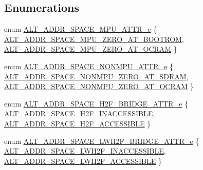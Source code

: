 \subsection*{Enumerations}
\begin{DoxyCompactItemize}
\item 
enum \mbox{\hyperlink{group__ADDR__SPACE__MGR__REMAP_gae16f0dfb718350b5140753a935059440}{A\+L\+T\+\_\+\+A\+D\+D\+R\+\_\+\+S\+P\+A\+C\+E\+\_\+\+M\+P\+U\+\_\+\+A\+T\+T\+R\+\_\+e}} \{ \mbox{\hyperlink{group__ADDR__SPACE__MGR__REMAP_ggae16f0dfb718350b5140753a935059440ad466ca623b8b9af96aa2d0036193600a}{A\+L\+T\+\_\+\+A\+D\+D\+R\+\_\+\+S\+P\+A\+C\+E\+\_\+\+M\+P\+U\+\_\+\+Z\+E\+R\+O\+\_\+\+A\+T\+\_\+\+B\+O\+O\+T\+R\+OM}}, 
\mbox{\hyperlink{group__ADDR__SPACE__MGR__REMAP_ggae16f0dfb718350b5140753a935059440a81e0393217ed113141ed94b5256eabf0}{A\+L\+T\+\_\+\+A\+D\+D\+R\+\_\+\+S\+P\+A\+C\+E\+\_\+\+M\+P\+U\+\_\+\+Z\+E\+R\+O\+\_\+\+A\+T\+\_\+\+O\+C\+R\+AM}}
 \}
\item 
enum \mbox{\hyperlink{group__ADDR__SPACE__MGR__REMAP_gae7413407ef45e9954d426e6e73a75463}{A\+L\+T\+\_\+\+A\+D\+D\+R\+\_\+\+S\+P\+A\+C\+E\+\_\+\+N\+O\+N\+M\+P\+U\+\_\+\+A\+T\+T\+R\+\_\+e}} \{ \mbox{\hyperlink{group__ADDR__SPACE__MGR__REMAP_ggae7413407ef45e9954d426e6e73a75463a7ca2d5a995bec6dcbfb71fa4c890270d}{A\+L\+T\+\_\+\+A\+D\+D\+R\+\_\+\+S\+P\+A\+C\+E\+\_\+\+N\+O\+N\+M\+P\+U\+\_\+\+Z\+E\+R\+O\+\_\+\+A\+T\+\_\+\+S\+D\+R\+AM}}, 
\mbox{\hyperlink{group__ADDR__SPACE__MGR__REMAP_ggae7413407ef45e9954d426e6e73a75463a23e283c9a0c53a84037261bf23c1bf65}{A\+L\+T\+\_\+\+A\+D\+D\+R\+\_\+\+S\+P\+A\+C\+E\+\_\+\+N\+O\+N\+M\+P\+U\+\_\+\+Z\+E\+R\+O\+\_\+\+A\+T\+\_\+\+O\+C\+R\+AM}}
 \}
\item 
enum \mbox{\hyperlink{group__ADDR__SPACE__MGR__REMAP_ga590307e85b3ad755df3f95dbb63f5f34}{A\+L\+T\+\_\+\+A\+D\+D\+R\+\_\+\+S\+P\+A\+C\+E\+\_\+\+H2\+F\+\_\+\+B\+R\+I\+D\+G\+E\+\_\+\+A\+T\+T\+R\+\_\+e}} \{ \mbox{\hyperlink{group__ADDR__SPACE__MGR__REMAP_gga590307e85b3ad755df3f95dbb63f5f34a7ea114327f3374de7327e122e9688ad8}{A\+L\+T\+\_\+\+A\+D\+D\+R\+\_\+\+S\+P\+A\+C\+E\+\_\+\+H2\+F\+\_\+\+I\+N\+A\+C\+C\+E\+S\+S\+I\+B\+LE}}, 
\mbox{\hyperlink{group__ADDR__SPACE__MGR__REMAP_gga590307e85b3ad755df3f95dbb63f5f34ac399d34c87ddb909b0d6fcf2a7211edd}{A\+L\+T\+\_\+\+A\+D\+D\+R\+\_\+\+S\+P\+A\+C\+E\+\_\+\+H2\+F\+\_\+\+A\+C\+C\+E\+S\+S\+I\+B\+LE}}
 \}
\item 
enum \mbox{\hyperlink{group__ADDR__SPACE__MGR__REMAP_gada9fe5e35537a5407d3e5a5216e3f6b5}{A\+L\+T\+\_\+\+A\+D\+D\+R\+\_\+\+S\+P\+A\+C\+E\+\_\+\+L\+W\+H2\+F\+\_\+\+B\+R\+I\+D\+G\+E\+\_\+\+A\+T\+T\+R\+\_\+e}} \{ \mbox{\hyperlink{group__ADDR__SPACE__MGR__REMAP_ggada9fe5e35537a5407d3e5a5216e3f6b5a107e69694932267f39e6e078bf038e45}{A\+L\+T\+\_\+\+A\+D\+D\+R\+\_\+\+S\+P\+A\+C\+E\+\_\+\+L\+W\+H2\+F\+\_\+\+I\+N\+A\+C\+C\+E\+S\+S\+I\+B\+LE}}, 
\mbox{\hyperlink{group__ADDR__SPACE__MGR__REMAP_ggada9fe5e35537a5407d3e5a5216e3f6b5a9c712c24a8f75fee557cc9442d5b6e42}{A\+L\+T\+\_\+\+A\+D\+D\+R\+\_\+\+S\+P\+A\+C\+E\+\_\+\+L\+W\+H2\+F\+\_\+\+A\+C\+C\+E\+S\+S\+I\+B\+LE}}
 \}
\end{DoxyCompactItemize}
